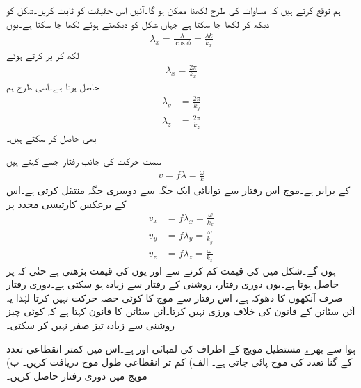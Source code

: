 ہم توقع کرتے ہیں کہ مساوات  کی طرح  لکھنا ممکن ہو گا۔آئیں اس حقیقت کو ثابت کریں۔شکل   کو دیکھ کر  لکھا جا سکتا ہے جہاں شکل کو دیکھتے ہوئے  لکھا جا سکتا ہے۔یوں
\begin{align*}
\lambda_x=\frac{\lambda}{\cos \phi}=\frac{\lambda k}{k_x}
\end{align*}
لکھ کر  پر کرتے ہوئے
\begin{align}
\lambda_x=\frac{2\pi}{k_x}
\end{align}
حاصل ہوتا ہے۔اسی طرح ہم 
\begin{align}
\lambda_y&=\frac{2\pi}{k_y}\\
\lambda_z&=\frac{2\pi}{k_z}
\end{align}
بھی حاصل کر سکتے ہیں۔

سمت حرکت کی جانب رفتار جسے  کہتے ہیں
\begin{align}
v=f\lambda=\frac{\omega}{k}
\end{align}
کے برابر ہے۔موج اس رفتار سے توانائی ایک جگہ سے دوسری جگہ منتقل کرتی ہے۔اس کے برعکس کارتیسی محدد پر  
\begin{align*}
v_x&=f \lambda_x=\frac{\omega}{k_x}\\
v_y&=f \lambda_y=\frac{\omega}{k_y}\\
v_z&=f \lambda_z=\frac{\omega}{k_z}
\end{align*}
ہوں گے۔شکل  میں  کی قیمت کم کرنے سے  اور یوں  کی قیمت بڑھتی ہے حتٰی کہ  پر  حاصل ہوتا ہے۔یوں دوری رفتار، روشنی کے رفتار سے زیادہ ہو سکتی ہے۔دوری رفتار  صرف آنکھوں کا دھوکہ ہے، اس رفتار سے موج کا کوئی حصہ حرکت نہیں کرتا لہٰذا یہ  آئن سٹائن کے قانون کی خلاف ورزی نہیں کرتا۔آئن سٹائن کا قانون کہتا ہے کہ کوئی چیز روشنی سے زیادہ تیز صفر نہیں کر سکتی۔

\newpage


ہوا سے بھرے مستطیل مویج کے اطراف کی لمبائی  اور  ہے۔اس میں کمتر انقطاعی تعدد کے  گنا تعدد کی موج پائی جاتی ہے۔ الف) کم تر انقطاعی طول موج دریافت کریں۔ ب) مویج میں دوری رفتار حاصل کریں۔

